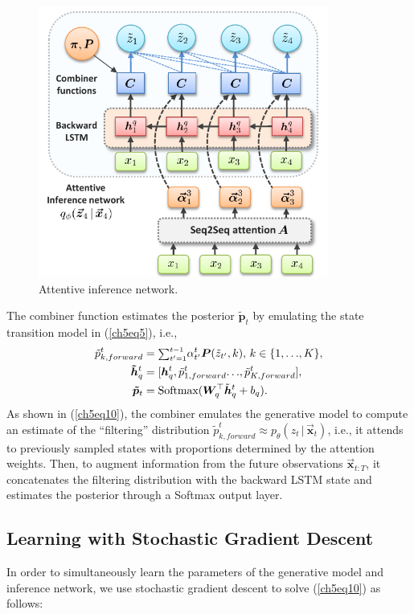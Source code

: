 \documentclass [PhD] {uclathes}
\begin{document}
\begin{figure}[t]
\centering
\includegraphics[width=3.75in]{ch5Fig3.pdf}
\caption{Attentive inference network.}
\label{ch5fig3}
\end{figure}

The combiner function estimates the posterior $\boldsymbol{\tilde{p}}_t$ by emulating the state transition model in (\ref{ch5eq5}), i.e.,
\begin{align} 
\tilde{p}^t_{k, forward}         &= \mbox{\footnotesize $\sum^{t-1}_{t^{\prime}=1}$}\alpha_{t^{\prime}}^t\boldsymbol{P}(\tilde{z}_{t^{\prime}},k),\, k \in \{1,.\,.\,.,K\},	\nonumber \\
\boldsymbol{\tilde{h}}^t_q &= [\boldsymbol{h}^t_q,\tilde{p}^t_{1, forward}.\,.\,.,\tilde{p}^t_{K, forward}], \nonumber \\
\boldsymbol{\tilde{p}}_t &= \mbox{Softmax}(\boldsymbol{W}_{q}^\top \tilde{\boldsymbol{h}}^t_q + b_q).
\label{ch5eq10}
\end{align}
As shown in (\ref{ch5eq10}), the combiner emulates the generative model to compute an estimate of the ``filtering'' distribution $\tilde{p}^t_{k, forward} \approx p_{\theta}(z_t\,|\,\boldsymbol{\vec{x}}_t)$, i.e., it attends to previously sampled states with proportions determined by the attention weights. Then, to augment information from the future observations $\boldsymbol{\vec{x}}_{t:T}$, it concatenates the filtering distribution with the backward LSTM state and estimates the posterior through a Softmax output layer.

\subsection{Learning with Stochastic Gradient Descent} 
\label{ch5sec33}
In order to simultaneously learn the parameters of the generative model and inference network, we use stochastic gradient descent to solve (\ref{ch5eq10}) as follows: 
\end{document}
